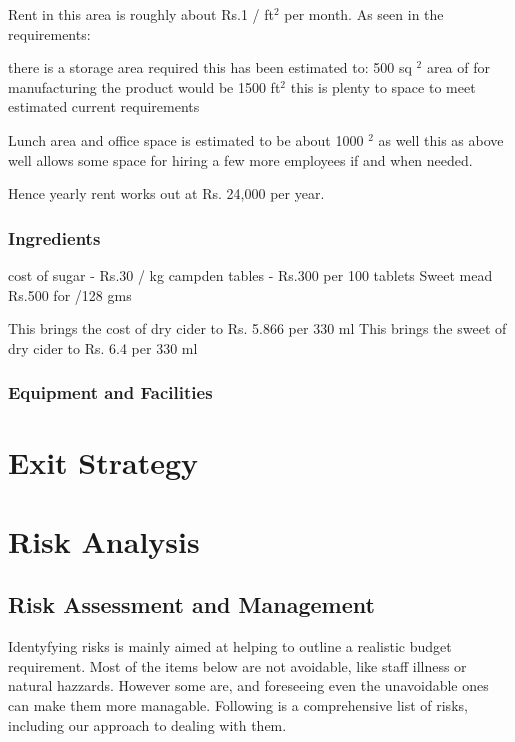\documentclass[11pt]{article}
\begin{document}
Rent in this area is roughly about Rs.1 / ft$^2$ per month.
As seen in the requirements:

there is a storage area required this has been estimated to: 500 sq $^2$ area of for manufacturing the product would be 1500 ft$^2$ this is plenty to space to meet estimated current requirements

Lunch area and office space is estimated to be about 1000 $^2$ as well this as above well allows some space for hiring a few more employees if and when needed.

Hence yearly rent works out at Rs. 24,000 per year.
   \subsubsection{Ingredients}
cost of sugar -  Rs.30 / kg
campden tables  - Rs.300 per 100 tablets
Sweet mead Rs.500 for /128 gms 


This brings the cost of dry cider to Rs. 5.866 per 330 ml
This brings the sweet of dry cider to Rs. 6.4 per 330 ml

\subsubsection{Equipment and Facilities}
\newpage

\section{Exit Strategy}

\newpage
\section{Risk Analysis}

  \subsection{Risk Assessment and Management}
  Identyfying risks is mainly aimed at helping to outline a realistic budget requirement. Most of the items below are not avoidable, like staff illness or natural hazzards. However some are, and foreseeing even the unavoidable ones can make them more managable. Following is a comprehensive list of risks, including our approach to dealing with them.
\end{document}
